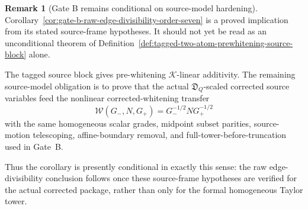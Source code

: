 \documentclass[11pt,a4paper]{amsart}
\theoremstyle{plain}
\theoremstyle{definition}
\newtheorem{remark}[theorem]{Remark}
\begin{document}
\begin{remark}[Gate B remains conditional on source-model hardening]
\label{rem:gate-b-source-model-hardening}
Corollary~\ref{cor:gate-b-raw-edge-divisibility-order-seven} is a proved
implication from its stated source-frame hypotheses.  It should not yet be
read as an unconditional theorem of
Definition~\ref{def:tagged-two-atom-prewhitening-source-block} alone.

The tagged source block gives pre-whitening \(\mathcal K\)-linear additivity.
The remaining source-model obligation is to prove that the actual
\(\mathfrak D_Q\)-scaled corrected source variables feed the nonlinear
corrected-whitening transfer
\[
\mathcal W(G_-,N,G_+)=G_-^{-1/2}NG_+^{-1/2}
\]
with the same homogeneous scalar grades, midpoint subset parities,
source-motion telescoping, affine-boundary removal, and
full-tower-before-truncation used in Gate~B.

Thus the corollary is presently conditional in exactly this sense: the raw
edge-divisibility conclusion follows once these source-frame hypotheses are
verified for the actual corrected package, rather than only for the formal
homogeneous Taylor tower.
\end{remark}
\end{document}
